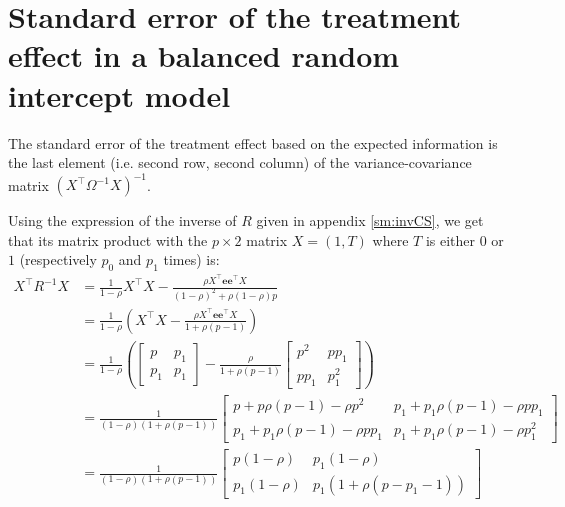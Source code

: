 \documentclass[12pt]{article}
\newcommand\Ve{\mathbf{e}}
\newcommand\trans[1]{{#1}^\intercal}%
\begin{document}
\clearpage

\section{Standard error of the treatment effect \newline in a balanced random intercept model}
\label{sm:seRI}
The standard error of the treatment effect based on the expected
information is the last element (i.e. second row, second column) of
the variance-covariance matrix \(\left(\trans{X} \Omega^{-1}
X\right)^{-1}\).

\bigskip

Using the expression of the inverse of \(R\) given in appendix
\ref{sm:invCS}, we get that its matrix product with the \(p \times 2\)
matrix \(X=(1,T)\) where \(T\) is either \(0\) or \(1\) (respectively
\(p_0\) and \(p_1\) times) is:
\begin{align*}
\trans{X} R^{-1} X &= \frac{1}{1-\rho} \trans{X}X - \frac{\rho\trans{X} \Ve\trans{\Ve} X}{(1-\rho)^2+\rho(1-\rho)p}  \\
&= \frac{1}{1-\rho} \left(\trans{X}X - \frac{\rho\trans{X} \Ve\trans{\Ve} X}{1 + \rho (p-1)}\right)  \\
&= \frac{1}{1-\rho} \left(\begin{bmatrix} p & p_1 \\ p_1 & p_1 \end{bmatrix} - \frac{\rho}{1+\rho(p-1)}  \begin{bmatrix} p^2 & p p_1 \\ p p_1 & p^2_1 \end{bmatrix}\right) \\
&= \frac{1}{(1-\rho)(1+\rho(p-1))} \begin{bmatrix} p+p\rho(p-1) - \rho p^2
                  & p_1+p_1\rho(p-1)- \rho p p_1
                  \\ p_1+p_1\rho(p-1)- \rho p p_1
                  & p_1+p_1\rho(p-1)- \rho p_1^2
\end{bmatrix}   \\
&= \frac{1}{(1-\rho)(1+\rho(p-1))} \begin{bmatrix} p(1-\rho)
                  & p_1(1-\rho)
                  \\ p_1(1-\rho)
                  & p_1(1+\rho (p-p_1-1))
\end{bmatrix}   
\end{align*}
\end{document}
